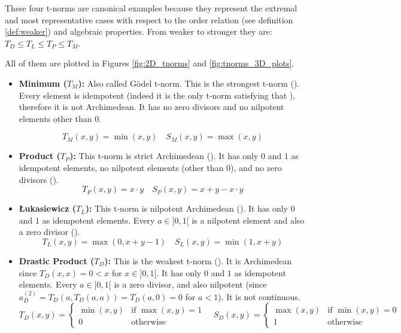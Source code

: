   \begin{example}\label{ex:basic_tnorms}
    These four t-norms are canonical examples because they represent the extremal and most representative cases with respect to the order relation (see definition \ref{def:weaker}) and algebraic properties. From weaker to stronger they are: $T_D \leq T_L \leq T_P \leq T_M$. 
    
    All of them are plotted in Figures \ref{fig:2D_tnorms} and \ref{fig:tnorms_3D_plots}.
      \begin{itemize}
        \item \textbf{Minimum ($T_M$):} Also called Gödel t-norm.
            This is the strongest t-norm (\cite[Rem.~1.5(i)]{Klement2000}). Every element is idempotent (indeed it is the only t-norm satisfying that \cite[Lem.~1.2.3]{FULLER2}), therefore it is not Archimedean. It has no zero divisors and no nilpotent elements other than 0.
    
        \[T_M(x, y) = \min(x, y) \quad S_M(x, y) = \max(x, y)
    \]
        \item \textbf{Product ($T_P$):} 
        This t-norm is strict Archimedean (\cite[Ex.~2.14(i)]{Klement2000}). It has only $0$ and $1$ as idempotent elements, no nilpotent elements (other than $0$), and no zero divisors (\cite[Ex.~2.2(i)]{Klement2000}).
        \[T_P(x, y) = x \cdot y \quad S_P(x, y) = x + y - x \cdot y\]
        \item \textbf{Łukasiewicz ($T_L$):} 
        This t-norm is nilpotent Archimedean (\cite[Ex.~2.14(i)]{Klement2000}). It has only $0$ and $1$ as idempotent elements. Every $a \in ]0,1[$ is a nilpotent element and also a zero divisor (\cite[Ex.~2.2(i)]{Klement2000}).
        \[T_L(x, y) = \max(0, x + y - 1) \quad S_L(x, y) = \min(1, x + y)\]
        \item \textbf{Drastic Product ($T_D$):} This is the weakest t-norm (\cite[Rem.~1.5(i)]{Klement2000}). It is Archimedean since $T_D(x,x)=0 < x$ for $x \in ]0,1[$. It has only $0$ and $1$ as idempotent elements. Every $a \in ]0,1[$ is a zero divisor, and also nilpotent (since $a_D^{(2)} = T_D(a, T_D(a,a)) = T_D(a,0) = 0$ for $a<1$). It is not continuous.
        \[T_D(x, y) = \begin{cases} \min(x,y) & \text{if } \max(x,y)=1 \\ 0 & \text{otherwise} \end{cases} \quad S_D(x, y) = \begin{cases} \max(x,y) & \text{if } \min(x,y)=0 \\ 1 & \text{otherwise} \end{cases}\]
      \end{itemize}
    \end{example}


